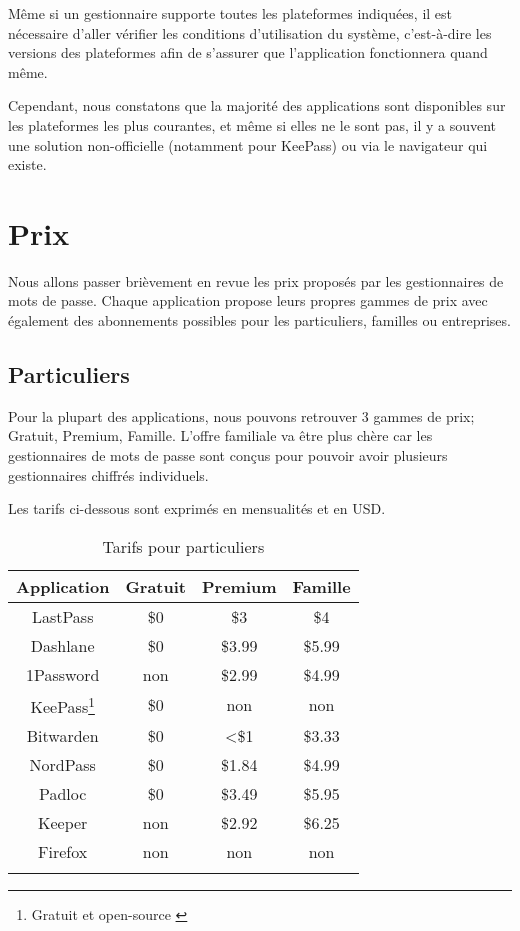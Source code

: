 Même si un gestionnaire supporte toutes les plateformes indiquées, il est nécessaire d'aller vérifier les conditions d'utilisation du système, c'est-à-dire les versions des plateformes afin de s'assurer que l'application fonctionnera quand même. 

Cependant, nous constatons que la majorité des applications sont disponibles sur les plateformes les plus courantes, et même si elles ne le sont pas, il y a souvent une solution non-officielle (notamment pour KeePass) ou via le navigateur qui existe.
\section{Prix}
Nous allons passer brièvement en revue les prix proposés par les gestionnaires de mots de passe. Chaque application propose leurs propres gammes de prix avec également des abonnements possibles pour les particuliers, familles ou entreprises. 
\subsection{Particuliers}
Pour la plupart des applications, nous pouvons retrouver 3 gammes de prix; Gratuit, Premium, Famille. L'offre familiale va être plus chère car les gestionnaires de mots de passe sont conçus pour pouvoir avoir plusieurs gestionnaires chiffrés individuels. 

Les tarifs ci-dessous sont exprimés en mensualités et en USD. \\
\begin{longtable}[h]{|c|c|c|c|}
		\hline
	Application & Gratuit & Premium & Famille \\
		\hline
	LastPass & \$0 & \$3 & \$4  \\
		\hline
	Dashlane & \$0 & \$3.99 & \$5.99 \\
		\hline
	1Password & non & \$2.99 & \$4.99  \\
		\hline
	KeePass\footnote{Gratuit et open-source \label{kp}} & \$0 & non & non   \\
		\hline
	Bitwarden & \$0 & <\$1 & \$3.33   \\
		\hline
	NordPass & \$0 & \$1.84 & \$4.99  \\
	\hline
	Padloc & \$0 & \$3.49 & \$5.95    \\
	\hline
	Keeper & non & \$2.92 & \$6.25  \\
	\hline
	Firefox & non & non & non  \\
	\hline
\caption{Tarifs pour particuliers}
\end{longtable}
